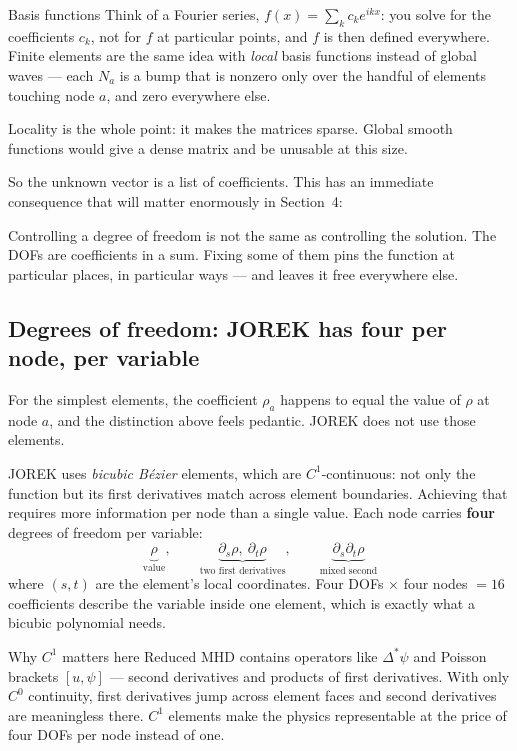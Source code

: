 \documentclass[11pt,a4paper]{article}
\begin{document}
\begin{concept}{Basis functions}
Think of a Fourier series, $f(x)=\sum_k c_k e^{ikx}$: you solve for the coefficients $c_k$, not for
$f$ at particular points, and $f$ is then defined everywhere. Finite elements are the same idea with
\emph{local} basis functions instead of global waves --- each $N_a$ is a bump that is nonzero only
over the handful of elements touching node $a$, and zero everywhere else.

Locality is the whole point: it makes the matrices sparse. Global smooth functions would give a dense
matrix and be unusable at this size.
\end{concept}

So the unknown vector is a list of coefficients. This has an immediate consequence that will matter
enormously in Section~4:

\begin{plain}
Controlling a degree of freedom is not the same as controlling the solution. The DOFs are
coefficients in a sum. Fixing some of them pins the function at particular places, in particular
ways --- and leaves it free everywhere else.
\end{plain}

\subsection{Degrees of freedom: JOREK has four per node, per variable}

For the simplest elements, the coefficient $\rho_a$ happens to equal the value of $\rho$ at node
$a$, and the distinction above feels pedantic. JOREK does not use those elements.

JOREK uses \emph{bicubic B\'ezier} elements, which are $C^1$-continuous: not only the function but
its first derivatives match across element boundaries. Achieving that requires more information per
node than a single value. Each node carries \textbf{four} degrees of freedom per variable:
\begin{equation}
  \underbrace{\rho}_{\text{value}},\qquad
  \underbrace{\partial_s\rho,\ \partial_t\rho}_{\text{two first derivatives}},\qquad
  \underbrace{\partial_s\partial_t\rho}_{\text{mixed second}}
\end{equation}
where $(s,t)$ are the element's local coordinates. Four DOFs $\times$ four nodes $=16$ coefficients
describe the variable inside one element, which is exactly what a bicubic polynomial needs.

\begin{concept}{Why $C^1$ matters here}
Reduced MHD contains operators like $\Delta^{*}\psi$ and Poisson brackets $[u,\psi]$ --- second
derivatives and products of first derivatives. With only $C^0$ continuity, first derivatives jump
across element faces and second derivatives are meaningless there. $C^1$ elements make the physics
representable at the price of four DOFs per node instead of one.
\end{concept}
\end{document}
